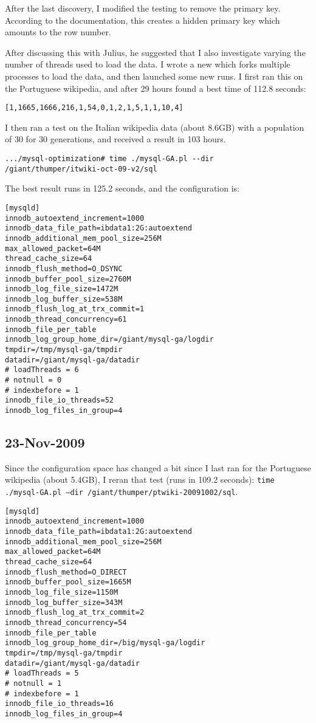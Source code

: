 After the last discovery, I modified the testing to remove the primary key.
According to the \mysql documentation, this creates a hidden primary key which
amounts to the row number.

After discussing this with Julius, he suggested that I also investigate varying
the number of threads used to load the data.
I wrote a new  which forks multiple \mysql processes to
load the data, and then launched some new runs.
I first ran this on the Portuguese wikipedia, and after 29 hours found a best time of
112.8 seconds:
\begin{verbatim}
[1,1665,1666,216,1,54,0,1,2,1,5,1,1,10,4]
\end{verbatim}

I then ran a test on the Italian wikipedia data (about 8.6GB) with a population of 30 for 30 generations,
and received a result in 103 hours.
\begin{verbatim}
.../mysql-optimization# time ./mysql-GA.pl --dir /giant/thumper/itwiki-oct-09-v2/sql
\end{verbatim}
The best result runs in 125.2 seconds, and the configuration is:
\begin{verbatim}
[mysqld]
innodb_autoextend_increment=1000
innodb_data_file_path=ibdata1:2G:autoextend
innodb_additional_mem_pool_size=256M
max_allowed_packet=64M
thread_cache_size=64
innodb_flush_method=O_DSYNC
innodb_buffer_pool_size=2760M
innodb_log_file_size=1472M
innodb_log_buffer_size=538M
innodb_flush_log_at_trx_commit=1
innodb_thread_concurrency=61
innodb_file_per_table
innodb_log_group_home_dir=/giant/mysql-ga/logdir
tmpdir=/tmp/mysql-ga/tmpdir
datadir=/giant/mysql-ga/datadir
# loadThreads = 6
# notnull = 0
# indexbefore = 1
innodb_file_io_threads=52
innodb_log_files_in_group=4
\end{verbatim}

\subsection{23-Nov-2009}

Since the configuration space has changed a bit since I last ran for
the Portuguese wikipedia (about 5.4GB), I reran that test (runs in 109.2 seconds):
\texttt{time ./mysql-GA.pl --dir /giant/thumper/ptwiki-20091002/sql}.

\begin{verbatim}
[mysqld]
innodb_autoextend_increment=1000
innodb_data_file_path=ibdata1:2G:autoextend
innodb_additional_mem_pool_size=256M
max_allowed_packet=64M
thread_cache_size=64
innodb_flush_method=O_DIRECT
innodb_buffer_pool_size=1665M
innodb_log_file_size=1150M
innodb_log_buffer_size=343M
innodb_flush_log_at_trx_commit=2
innodb_thread_concurrency=54
innodb_file_per_table
innodb_log_group_home_dir=/big/mysql-ga/logdir
tmpdir=/tmp/mysql-ga/tmpdir
datadir=/giant/mysql-ga/datadir
# loadThreads = 5
# notnull = 1
# indexbefore = 1
innodb_file_io_threads=16
innodb_log_files_in_group=4
\end{verbatim}

